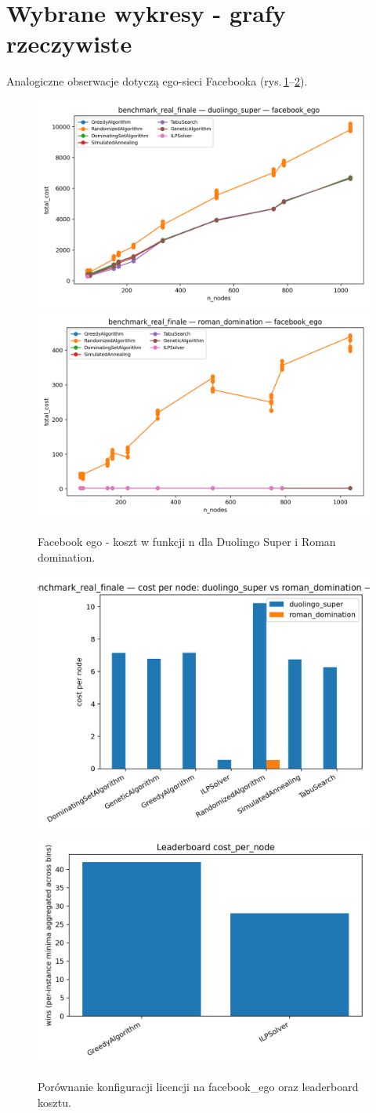 \section{Wybrane wykresy - grafy rzeczywiste}
Analogiczne obserwacje dotyczą ego-sieci Facebooka (rys.\,\ref{fig:facebook_ego_cost}–\ref{fig:facebook_compare_cost}).

\begin{figure}[h]
  \centering
  \includegraphics[width=0.48\linewidth]{assets/figures/br_facebook_ego_duo_cost_vs_n.png}
  \includegraphics[width=0.48\linewidth]{assets/figures/br_facebook_ego_roman_cost_vs_n.png}
  \caption{Facebook ego - koszt w funkcji n dla Duolingo Super i Roman domination.}
  \label{fig:facebook_ego_cost}
\end{figure}

\begin{figure}[h]
  \centering
  \includegraphics[width=0.48\linewidth]{assets/figures/br_compare_cost_duo_vs_roman_facebook_ego.png}
  \includegraphics[width=0.48\linewidth]{assets/figures/br_leaderboard_cost.png}
  \caption{Porównanie konfiguracji licencji na facebook\_ego oraz leaderboard kosztu.}
  \label{fig:facebook_compare_cost}
\end{figure}

